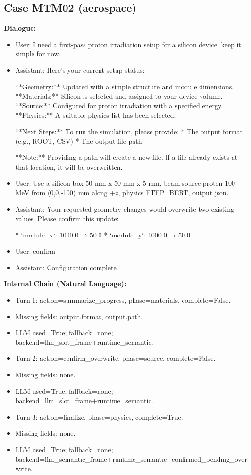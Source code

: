 \documentclass[11pt]{ctexart}
\begin{document}
\subsection{Case MTM02 (aerospace)}
\textbf{Dialogue:}
\begin{itemize}
\item User: I need a first-pass proton irradiation setup for a silicon device; keep it simple for now.
\item Assistant: Here's your current setup status:

**Geometry:** Updated with a simple structure and module dimensions.
**Materials:** Silicon is selected and assigned to your device volume.
**Source:** Configured for proton irradiation with a specified energy.
**Physics:** A suitable physics list has been selected.

**Next Steps:** To run the simulation, please provide:
*   The output format (e.g., ROOT, CSV)
*   The output file path

**Note:** Providing a path will create a new file. If a file already exists at that location, it will be overwritten.
\item User: Use a silicon box 50 mm x 50 mm x 5 mm, beam source proton 100 MeV from (0,0,-100) mm along +z, physics FTFP\_BERT, output json.
\item Assistant: Your requested geometry changes would overwrite two existing values. Please confirm this update:

*   `module\_x`: 1000.0 → 50.0
*   `module\_y`: 1000.0 → 50.0
\item User: confirm
\item Assistant: Configuration complete.
\end{itemize}
\textbf{Internal Chain (Natural Language):}
\begin{itemize}
\item Turn 1: action=summarize\_progress, phase=materials, complete=False.
\item Missing fields: output.format, output.path.
\item LLM used=True; fallback=none; backend=llm\_slot\_frame+runtime\_semantic.
\item Turn 2: action=confirm\_overwrite, phase=source, complete=False.
\item Missing fields: none.
\item LLM used=True; fallback=none; backend=llm\_slot\_frame+runtime\_semantic.
\item Turn 3: action=finalize, phase=physics, complete=True.
\item Missing fields: none.
\item LLM used=True; fallback=none; backend=llm\_semantic\_frame+runtime\_semantic+confirmed\_pending\_overwrite.
\end{itemize}
\end{document}
